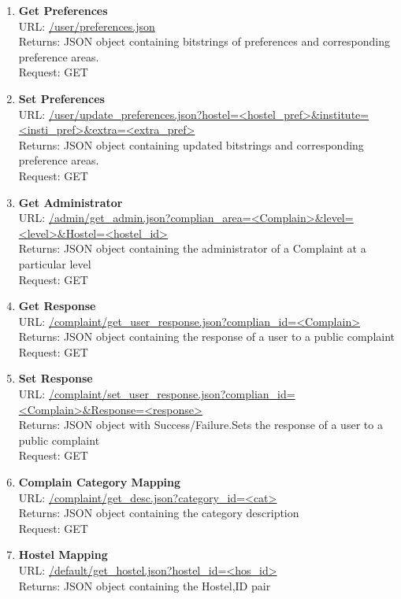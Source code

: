 \documentclass{article}
\begin{document}
\begin{enumerate}
					\item \textbf{Get Preferences} \\
						URL: \url{/user/preferences.json} \\
						Returns: JSON object containing bitstrings of preferences and corresponding preference areas.\\
						Request: GET
					\item \textbf{Set Preferences} \\
						URL: \url{/user/update_preferences.json?hostel=<hostel_pref>&institute=<insti_pref>&extra=<extra_pref>} \\
						Returns:  JSON object containing updated bitstrings and corresponding preference areas.\\
						Request: GET
					\item \textbf{Get Administrator} \\
						URL: \url{/admin/get_admin.json?complian_area=<Complain>&level=<level>&Hostel=<hostel_id>}\\
						Returns:  JSON object containing  the administrator of a Complaint at a particular level\\
						Request: GET
					\item \textbf{Get Response} \\
						URL: \url{/complaint/get_user_response.json?complian_id=<Complain>}\\
						Returns:  JSON object containing the response of a user to a public complaint \\
						Request: GET
					\item \textbf{Set Response} \\
						URL: \url{/complaint/set_user_response.json?complian_id=<Complain>&Response=<response>}\\
						Returns:   JSON object with Success/Failure.Sets the response of a user to a public complaint\\
						Request: GET 
					\item \textbf{Complain Category Mapping} \\
						URL: \url{/complaint/get_desc.json?category_id=<cat>}\\
						Returns:   JSON object containing the category description\\
						Request: GET 
					\item \textbf{Hostel Mapping} \\
						URL: \url{/default/get_hostel.json?hostel_id=<hos_id>}\\
						Returns:  JSON object containing the Hostel,ID pair\\

\end{enumerate}
\end{document}

